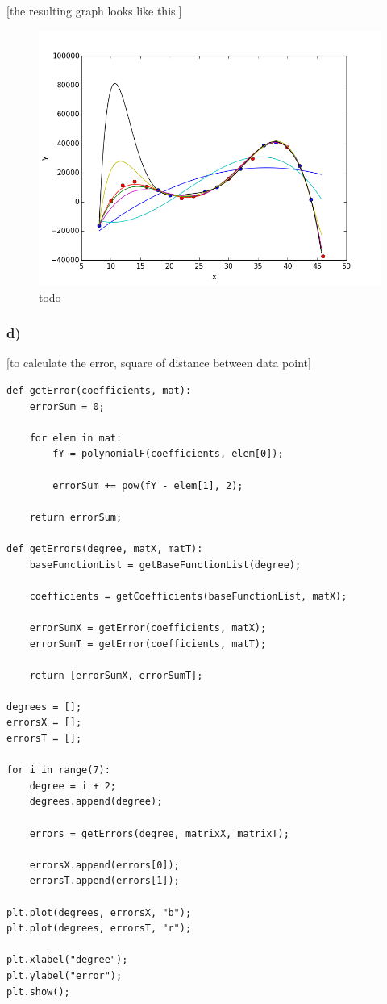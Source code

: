 [the resulting graph looks like this.]

\begin{figure}[!ht]
\includegraphics[width=1\textwidth]{chapters/images/figure-5-11-c}
\caption{todo}
\end{figure}


\subsubsection{d)}

[to calculate the error, square of distance between data point]

\begin{lstlisting}[caption=todo]
def getError(coefficients, mat):
	errorSum = 0;
	
	for elem in mat:
		fY = polynomialF(coefficients, elem[0]);
		
		errorSum += pow(fY - elem[1], 2);
	
	return errorSum;

def getErrors(degree, matX, matT):
	baseFunctionList = getBaseFunctionList(degree);
	
	coefficients = getCoefficients(baseFunctionList, matX);
	
	errorSumX = getError(coefficients, matX);
	errorSumT = getError(coefficients, matT);
	
	return [errorSumX, errorSumT];

degrees = [];
errorsX = [];
errorsT = [];

for i in range(7):
	degree = i + 2;
	degrees.append(degree);
	
	errors = getErrors(degree, matrixX, matrixT);
	
	errorsX.append(errors[0]);
	errorsT.append(errors[1]);

plt.plot(degrees, errorsX, "b");
plt.plot(degrees, errorsT, "r");

plt.xlabel("degree");
plt.ylabel("error");
plt.show();
\end{lstlisting}

